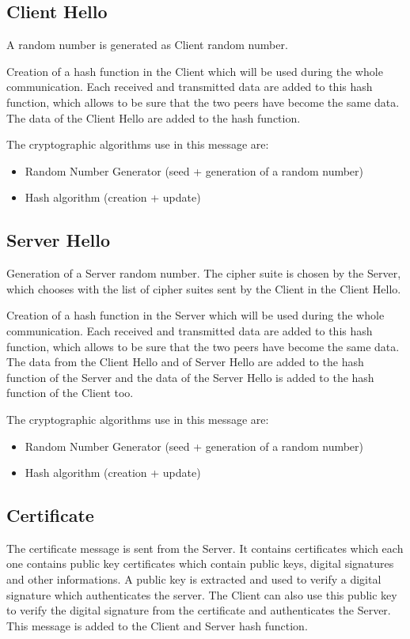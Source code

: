 \subsection*{Client Hello}

A random number is generated as Client random number.

Creation of a hash function in the Client which will be used during the whole
communication.
Each received and transmitted data are added to this hash function, which allows
to be sure that the two peers have become the same data. The data of the Client
Hello are added to the hash function.

The cryptographic algorithms use in this message are:
\begin{itemize}[noitemsep]
  \item Random Number Generator (seed + generation of a random number)
  \item Hash algorithm (creation + update)
\end{itemize}


\subsection*{Server Hello}

Generation of a Server random number.
The cipher suite is chosen by the Server, which chooses with the list of cipher
suites sent by the Client in the Client Hello.

Creation of a hash function in the Server which will be used during the whole
communication.
Each received and transmitted data are added to this hash function, which allows
to be sure that the two peers have become the same data. 
The data from the Client Hello and of Server Hello are added to the hash
function of the Server and the data of the Server Hello is added to the hash
function of the Client too.

The cryptographic algorithms use in this message are:
\begin{itemize}[noitemsep]
  \item Random Number Generator (seed + generation of a random number)
  \item Hash algorithm (creation + update)
\end{itemize}

\subsection*{Certificate}
The certificate message is sent from the Server. It contains certificates which
each one contains public key certificates which contain public keys,
digital signatures and other informations.
A public key is extracted and used to verify a digital signature which
authenticates the server.
The Client can also use this public key to verify the digital signature from
the certificate and authenticates the Server.
This message is added to the Client and Server hash function.

